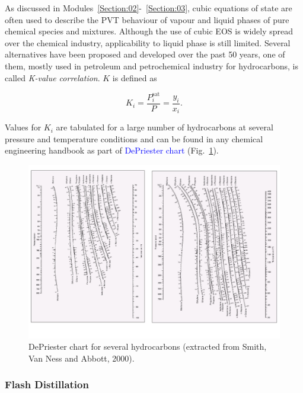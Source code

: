 \documentclass[12pts,a4paper,amsmath,amssymb,floatfix]{article}%
\newcommand{\frc}{\displaystyle\frac}
\newcommand{\blue}{\textcolor{blue}}
\begin{document}
As discussed in Modules~\ref{Section:02}-~\ref{Section:03}, cubic equations of state are often used to describe the PVT behaviour of vapour and liquid phases of pure chemical species and mixtures. Although the use of cubic EOS is widely spread over the chemical industry, applicability to liquid phase is still limited. Several alternatives have been proposed and developed over the past 50 years, one of them, mostly used in petroleum and petrochemical industry for hydrocarbons, is called {\it K-value correlation}. $K$ is defined as
\begin{shaded}
   \begin{equation}
      K_{i} = \frc{P_{i}^{\text{sat}}}{P} = \frc{y_{i}}{x_{i}}.\label{Mod04_KValue}
   \end{equation}
\end{shaded}
Values for $K_{i}$ are tabulated for a large number of hydrocarbons at several pressure and temperature conditions and can be found in any chemical engineering handbook as part of \blue{DePriester chart} (Fig.~\ref{Mod04Fig05}).
  \begin{figure}[h]
     \begin{center}
         \includegraphics[width=1.\linewidth,clip]{./Figs/DePriesterCharts}
     \end{center}
     \caption{DePriester chart for several hydrocarbons (extracted from Smith, Van Ness and Abbott, 2000).}\label{Mod04Fig05}
  \end{figure}


\subsubsection{Flash Distillation}
\end{document}
